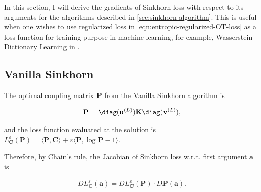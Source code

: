 
In this section, I will derive the gradients of Sinkhorn loss with respect to its arguments for the algorithms
described in \cref{sec:sinkhorn-algorithm}.
This is useful when one wishes to use regularized loss in \cref{eqn:entropic-regularized-OT-loss}
as a loss function for training purpose in machine learning, for example,
Wasserstein Dictionary Learning in .




















\subsection{Vanilla Sinkhorn}\label{subsec:gradient-vanilla-sinkhorn}

The optimal coupling matrix $\mathbf{P}$ from the Vanilla Sinkhorn algorithm is

\begin{equation}\label{eqn:optimal-coupling-solution-from-sinkhorn}
  \begin{aligned}
    \mathbf{P} = \diag(\mathbf{u}^{(L)}) \mathbf{K} \diag(\mathbf{v}^{(L)}),
  \end{aligned}
\end{equation}

and the loss function evaluated at the solution is
$L_{\mathbf{C}}^\varepsilon(\mathbf{P}) =
  \langle \mathbf{P}, \mathbf{C}\rangle + \varepsilon\langle\mathbf{P}, \log \mathbf{P} - 1\rangle $.

Therefore, by Chain's rule, the Jacobian of Sinkhorn loss w.r.t. first argument $\mathbf{a}$ is

\begin{equation}\label{eqn:jacobian-loss-wrt-chainrule}
  \begin{aligned}
    D L_{\mathbf{C}}^\varepsilon(\mathbf{a})
    = D L_{\mathbf{C}}^\varepsilon(\mathbf{P}) \cdot D \mathbf{P}(\mathbf{a}).
  \end{aligned}
\end{equation}

